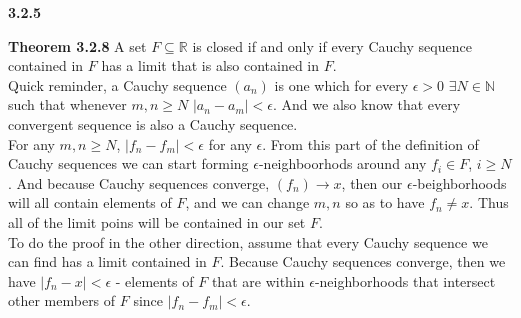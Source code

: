 \textbf{3.2.5}

\textbf{Theorem 3.2.8} A set $F \subseteq \mathbb{R}$ is closed if and only if every
Cauchy sequence contained in $F$ has a limit that is also contained in $F$.
\\

Quick reminder, a Cauchy sequence $(a_n)$ is one which for every $\epsilon >0$
$\exists N\in\mathbb{N}$ such that whenever $m,n \geq N$ $|a_n - a_m| < \epsilon$.
And we also know that every convergent sequence is also a Cauchy sequence.
\\

For any $m,n \geq N$, $|f_n - f_m| < \epsilon$ for any $\epsilon$.
From this part of the definition of Cauchy sequences we can start forming $\epsilon$-neighboorhods
around any $f_i \in F$, $i \geq N$.
And because Cauchy sequences converge, $(f_n) \rightarrow x$, then our $\epsilon$-beighborhoods
will all contain elements of $F$, and we can change $m,n$ so as to have $f_n \neq x$.
Thus all of the limit poins will be contained in our set $F$.
\\

To do the proof in the other direction, assume that every Cauchy sequence we can find has a limit
contained in $F$.
Because Cauchy sequences converge, then we have $|f_n - x| < \epsilon$ - elements of $F$
that are within $\epsilon$-neighborhoods that intersect other members of $F$ since $|f_n - f_m|<\epsilon$.
\\~\\